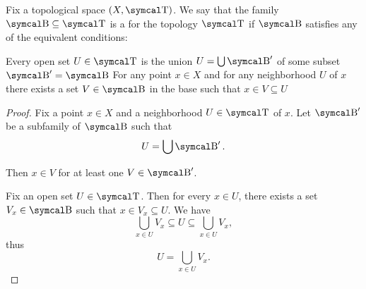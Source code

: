\begin{definition}\label{def:topological_base}
  Fix a topological space \( (X, \CT) \). We say that the family \( \CB \subseteq \CT \) is a  for the topology \( \CT \) if \( \CB \) satisfies any of the equivalent conditions:
  \begin{DefEnum}
     Every open set \( U \in \CT \) is the union \( U = \bigcup \CB' \) of some subset \( \CB' = \CB \)
     For any point \( x \in X \) and for any neighborhood \( U \) of \( x \) there exists a set \( V \in \CB \) in the base such that \( x \in V \subseteq U \)
  \end{DefEnum}
\end{definition}
\begin{proof}
   Fix a point \( x \in X \) and a neighborhood \( U \in \CT \) of \( x \). Let \( \CB' \) be a subfamily of \( \CB \) such that
  \begin{equation*}
    U = \bigcup \CB'.
  \end{equation*}

  Then \( x \in V \) for at least one \( V \in \CB' \).

   Fix an open set \( U \in \CT \). Then for every \( x \in U \), there exists a set \( V_x \in \CB \) such that \( x \in V_x \subseteq U \). We have
  \begin{equation*}
    \bigcup_{x \in U} V_x \subseteq U \subseteq \bigcup_{x \in U} V_x,
  \end{equation*}
  thus
  \begin{equation*}
    U = \bigcup_{x \in U} V_x.
  \end{equation*}
\end{proof}


